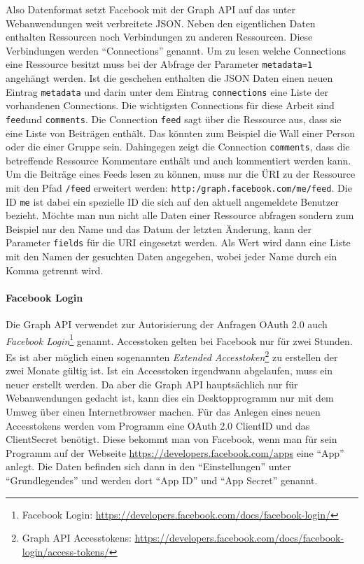 Also Datenformat setzt Facebook mit der Graph API auf das unter Webanwendungen weit verbreitete JSON. Neben den eigentlichen Daten enthalten Ressourcen noch Verbindungen zu anderen Ressourcen. Diese Verbindungen werden \enquote{Connections} genannt. Um zu lesen welche Connections eine Ressource besitzt muss bei der Abfrage der Parameter \texttt{metadata=1} angehängt werden. Ist die geschehen enthalten die JSON Daten einen neuen Eintrag \texttt{metadata} und darin unter dem Eintrag \texttt{connections} eine Liste der vorhandenen Connections. Die wichtigsten Connections für diese Arbeit sind \texttt{feed}und \texttt{comments}. Die Connection \texttt{feed} sagt über die Ressource aus, dass sie eine Liste von Beiträgen enthält. Das könnten zum Beispiel die Wall einer Person oder die einer Gruppe sein. Dahingegen zeigt die Connection \texttt{comments}, dass die betreffende Ressource Kommentare enthält und auch kommentiert werden kann. Um die Beiträge eines Feeds lesen zu können, muss nur die ÜRI zu der Ressource mit den Pfad \texttt{/feed} erweitert werden: \texttt{http:/graph.facebook.com/me/feed}. Die ID \texttt{me} ist dabei ein spezielle ID die sich auf den aktuell angemeldete Benutzer bezieht. Möchte man nun nicht alle Daten einer Ressource abfragen sondern zum Beispiel nur den Name und das Datum der letzten Änderung, kann der Parameter \texttt{fields} für die URI eingesetzt werden. Als Wert wird dann eine Liste mit den Namen der gesuchten Daten angegeben, wobei jeder Name durch ein Komma getrennt wird. 


\paragraph{Facebook Login} %
\label{par:facebook_login}

Die Graph API verwendet zur Autorisierung der Anfragen OAuth 2.0 auch \emph{Facebook Login}\footnote{Facebook Login: \url{https://developers.facebook.com/docs/facebook-login/}} genannt. Accesstoken gelten bei Facebook nur für zwei Stunden. Es ist aber möglich einen sogenannten \emph{Extended Accesstoken}\footnote{Graph API Accesstokens: \url{https://developers.facebook.com/docs/facebook-login/access-tokens/}} zu erstellen der zwei Monate gültig ist. Ist ein Accesstoken irgendwann abgelaufen, muss ein neuer erstellt werden. Da aber die Graph API hauptsächlich nur für Webanwendungen gedacht ist, kann dies ein Desktopprogramm nur mit dem Umweg über einen Internetbrowser machen. Für das Anlegen eines neuen Accesstokens werden vom Programm eine OAuth 2.0 ClientID und das ClientSecret benötigt. Diese bekommt man von Facebook, wenn man für sein Programm auf der Webseite \url{https://developers.facebook.com/apps} eine \enquote{App} anlegt. Die Daten befinden sich dann in den \enquote{Einstellungen} unter \enquote{Grundlegendes} und werden dort \enquote{App ID} und \enquote{App Secret} genannt.


